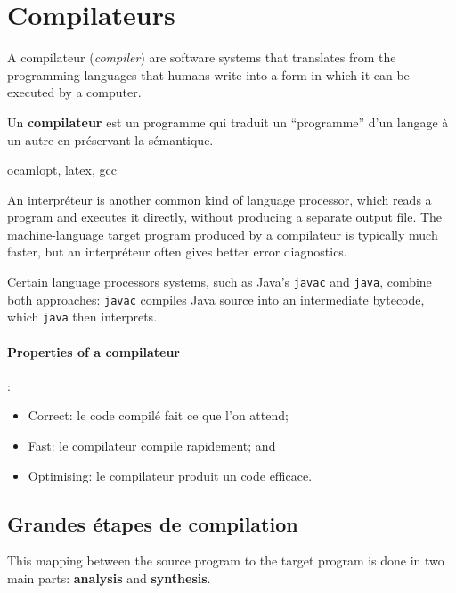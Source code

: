 \section{Compilateurs}
A compilateur (\textit{compiler}) are software systems that translates from
the programming languages that humans write into a form in which it can be executed
by a computer. 

\begin{definition}[Compilateur]
  Un \textbf{compilateur} est un programme qui traduit un ``programme'' d'un
  langage à un autre en préservant la sémantique.
\end{definition}
\begin{example}[Compilateurs]
  ocamlopt, latex, gcc
\end{example}

An interpréteur is another common kind of language processor, which reads a
program and executes it directly, without producing a separate output file. The
machine-language target program produced by a compilateur is typically much
faster, but an interpréteur often gives better error diagnostics.\\

\begin{example}
  Certain language processors systems, such as Java's \texttt{javac} and
  \texttt{java}, combine both approaches: \texttt{javac} compiles Java source
  into an intermediate bytecode, which \texttt{java} then interprets.
\end{example}

\paragraph{Properties of a compilateur}:
\begin{itemize}
  \item Correct: le code compilé fait ce que l'on attend;
  \item Fast: le compilateur compile rapidement; and
  \item Optimising: le compilateur produit un code efficace.
\end{itemize}

\subsection{Grandes étapes de compilation}
This mapping between the source program to the target program is done in two main parts:
\textbf{analysis} and \textbf{synthesis}.

